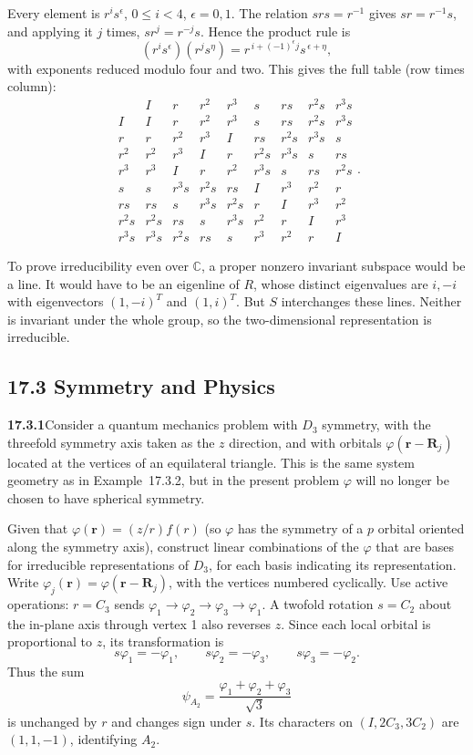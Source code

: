 Every element is $r^is^\epsilon$, $0\le i<4$, $\epsilon=0,1$.
The relation $srs=r^{-1}$ gives $sr=r^{-1}s$, and applying it
$j$ times, $sr^j=r^{-j}s$. Hence the product rule is
\[
(r^is^\epsilon)(r^js^\eta)
=r^{\,i+(-1)^\epsilon j}s^{\,\epsilon+\eta},
\]
with exponents reduced modulo four and two. This gives the full table
(row times column):
\[
\begin{array}{c|cccccccc}
&I&r&r^2&r^3&s&rs&r^2s&r^3s\\\hline
I&I&r&r^2&r^3&s&rs&r^2s&r^3s\\
r&r&r^2&r^3&I&rs&r^2s&r^3s&s\\
r^2&r^2&r^3&I&r&r^2s&r^3s&s&rs\\
r^3&r^3&I&r&r^2&r^3s&s&rs&r^2s\\
s&s&r^3s&r^2s&rs&I&r^3&r^2&r\\
rs&rs&s&r^3s&r^2s&r&I&r^3&r^2\\
r^2s&r^2s&rs&s&r^3s&r^2&r&I&r^3\\
r^3s&r^3s&r^2s&rs&s&r^3&r^2&r&I
\end{array}.
\]

To prove irreducibility even over $\mathbb C$, a proper nonzero
invariant subspace would be a line. It would have to be an
eigenline of $R$, whose distinct eigenvalues are $i,-i$ with
eigenvectors $(1,-i)^T$ and $(1,i)^T$.
But $S$ interchanges these lines. Neither is invariant under
the whole group, so the two-dimensional representation is irreducible.

\subsection*{17.3 Symmetry and Physics}

\par\bigskip
\noindent\textbf{17.3.1}\quad Consider a quantum mechanics problem
with $D_{3}$ symmetry, with the threefold symmetry axis taken as the
$z$ direction, and with orbitals $\varphi(\mathbf{r}-\mathbf{R}_{j})$
located at the vertices of an equilateral triangle. This is the same
system geometry as in Example~17.3.2, but in the present problem
$\varphi$ will no longer be chosen to have spherical symmetry.
\par Given that $\varphi(\mathbf{r})=(z/r)f(r)$ (so $\varphi$ has the
symmetry of a $p$ orbital oriented along the symmetry axis),
construct linear combinations of the $\varphi$ that are bases for
irreducible representations of $D_{3}$, for each basis indicating its
representation.
\solution
Write $\varphi_j(\mathbf r)=\varphi(\mathbf r-\mathbf R_j)$,
with the vertices numbered cyclically. Use active operations:
$r=C_3$ sends $\varphi_1\to\varphi_2\to\varphi_3\to\varphi_1$.
A twofold rotation $s=C_2$ about the in-plane axis through vertex 1
also reverses $z$. Since each local orbital is proportional to
$z$, its transformation is
\[
s\varphi_1=-\varphi_1,\qquad
s\varphi_2=-\varphi_3,\qquad
s\varphi_3=-\varphi_2.
\]
Thus the sum
\[
\boxed{\psi_{A_2}=\frac{\varphi_1+\varphi_2+\varphi_3}{\sqrt3}}
\]
is unchanged by $r$ and changes sign under $s$.
Its characters on $(I,2C_3,3C_2)$ are $(1,1,-1)$, identifying $A_2$.

